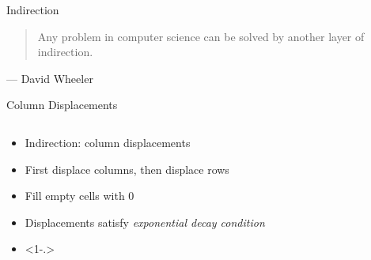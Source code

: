 \begin{frame}{Indirection}
	\begin{quotation}
		Any problem in computer science can be solved by another layer of indirection.
	\end{quotation}
	\vspace*{-1em}
	\begin{flushright}
		\textup{
		--- David Wheeler
		}
	\end{flushright}
\end{frame}

\begin{frame}{Column Displacements}
	\begin{columns}
		\begin{column}[T]{0.6\textwidth}
			\begin{itemize}[<+->]
				\itemspacing{20pt}
				\item Indirection: column displacements
				\item First displace columns, then displace rows
				\item Fill empty cells with 0
				\item Displacements satisfy \emph{exponential decay condition}
				\item[]<1-.>
			\end{itemize}
		\end{column}
		

\end{columns}
\end{frame}
